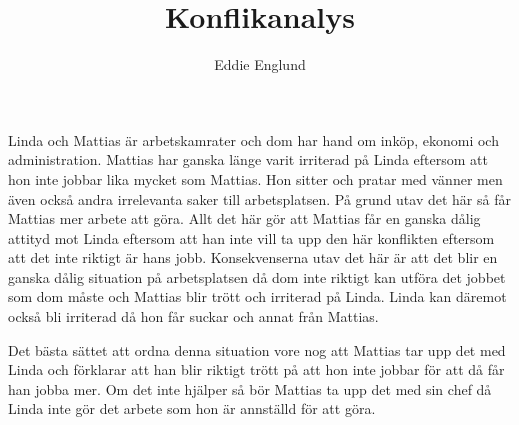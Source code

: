 \documentclass[12pt]{article}
\title{Konflikanalys}
\author{Eddie Englund}
\begin{document}
    \maketitle


    

    Linda och Mattias är arbetskamrater och dom har hand om inköp, ekonomi och administration. Mattias har ganska länge varit irriterad på Linda eftersom att hon inte jobbar lika mycket som Mattias. Hon sitter och pratar med vänner men även också andra irrelevanta saker till arbetsplatsen. På grund utav det här så får Mattias mer arbete att göra. Allt det här gör att Mattias får en ganska dålig attityd mot Linda eftersom att han inte vill ta upp den här konflikten eftersom att det inte riktigt är hans jobb.
    \vspace{1cm}
    Konsekvenserna utav det här är att det blir en ganska dålig situation på arbetsplatsen då dom inte riktigt kan utföra det jobbet som dom måste och Mattias blir trött och irriterad på Linda. Linda kan däremot också bli irriterad då hon får suckar och annat från Mattias.
    \vspace{1cm}

    Det bästa sättet att ordna denna situation vore nog att Mattias tar upp det med Linda och förklarar att han blir riktigt trött på att hon inte jobbar för att då får han jobba mer. Om det inte hjälper så bör Mattias ta upp det med sin chef då Linda inte gör det arbete som hon är annställd för att göra. 
\end{document}
